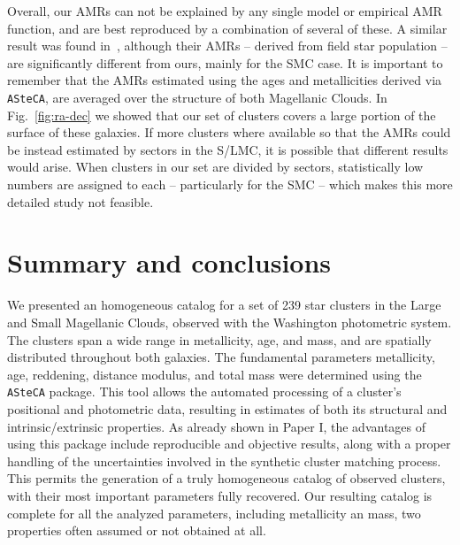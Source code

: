 \documentclass{aa}
\begin{document}
Overall, our AMRs can not be explained by any single model or empirical AMR
function, and are best reproduced by a combination of several of these. A
similar result was found in~\cite{Piatti_Geisler_2013}, although their AMRs --
derived from field star population -- are significantly different from ours,
mainly for the SMC case.
%
It is important to remember that the AMRs estimated using the ages and
metallicities derived via \texttt{ASteCA}, are averaged over the structure of
both Magellanic Clouds. In Fig.~\ref{fig:ra-dec} we showed that our set of
clusters covers a large portion of the surface of these galaxies.
%
If more clusters where available so that the AMRs could be instead estimated by
sectors in the S/LMC, it is possible that different results would arise. When
clusters in our set are divided by sectors, statistically low numbers are
assigned to each -- particularly for the SMC -- which makes this more detailed
study not feasible.





\section{Summary and conclusions}
\label{sec:summ-concl}

We presented an homogeneous catalog for a set of 239 star clusters in the
Large and Small Magellanic Clouds, observed with the Washington photometric
system. The clusters span a wide range in metallicity, age, and mass, and are
spatially distributed throughout both galaxies.
%
The fundamental parameters metallicity, age, reddening, distance modulus, and
total mass were determined using the \texttt{ASteCA} package.
%
This tool allows the automated processing of a cluster's positional and photometric
data, resulting in estimates of both its structural and intrinsic/extrinsic
properties.
%
As already shown in Paper I, the advantages of using this package include
reproducible and objective results, along with a proper handling of the
uncertainties involved in the synthetic cluster matching process.
%
This permits the generation of a truly homogeneous catalog of observed
clusters, with their most important parameters fully recovered.
%
Our resulting catalog is complete for all the analyzed parameters, including
metallicity an mass, two properties often assumed or not obtained at all.
\end{document}
